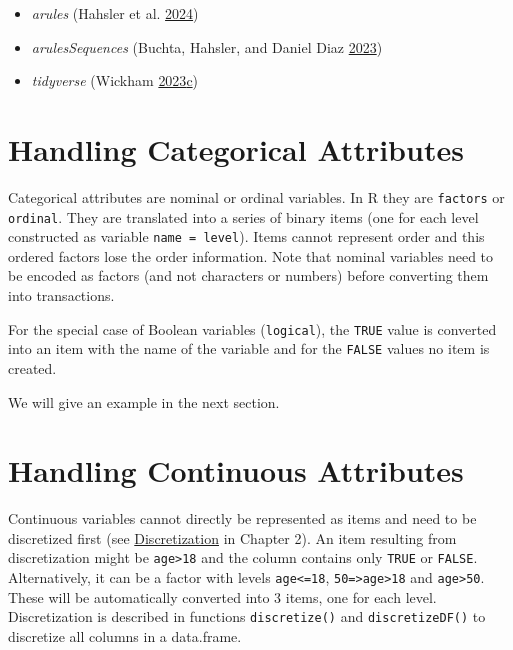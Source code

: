 \documentclass[
  notitlepage]{book}
\providecommand{\tightlist}{%
  \setlength{\itemsep}{0pt}\setlength{\parskip}{0pt}}
\begin{document}
\begin{itemize}
\tightlist
\item
  \emph{arules} (Hahsler et al. \protect\hyperlink{ref-R-arules}{2024})
\item
  \emph{arulesSequences} (Buchta, Hahsler, and Daniel Diaz \protect\hyperlink{ref-R-arulesSequences}{2023})
\item
  \emph{tidyverse} (Wickham \protect\hyperlink{ref-R-tidyverse}{2023}\protect\hyperlink{ref-R-tidyverse}{c})
\end{itemize}

\hypertarget{handling-categorical-attributes}{%
\section{Handling Categorical Attributes}\label{handling-categorical-attributes}}

Categorical attributes are nominal or ordinal variables.
In R they are \texttt{factors} or \texttt{ordinal}. They are
translated into a series of binary items (one for each level constructed as ⁠variable
\texttt{name\ =\ level}⁠). Items cannot represent order and this ordered factors lose
the order information. Note that nominal variables need to be encoded as
factors (and not characters or numbers) before converting them into transactions.

For the special case of Boolean variables (\texttt{logical}), the \texttt{TRUE} value is
converted into an item with the name of the variable and for the \texttt{FALSE}
values no item is created.

We will give an example in the next section.

\hypertarget{handling-continuous-attributes}{%
\section{Handling Continuous Attributes}\label{handling-continuous-attributes}}

Continuous variables cannot directly be represented as items and need to be
discretized first (see \protect\hyperlink{discretization}{Discretization} in Chapter 2).
An item resulting from discretization might be \texttt{age\textgreater{}18} and
the column contains only \texttt{TRUE} or \texttt{FALSE}. Alternatively, it can be a factor
with levels \texttt{age\textless{}=18}, \texttt{⁠50=\textgreater{}age\textgreater{}18}⁠ and \texttt{age\textgreater{}50}. These will be automatically
converted into 3 items, one for each level. Discretization is described in functions
\texttt{discretize()} and \texttt{discretizeDF()} to discretize all columns in a data.frame.
\end{document}
